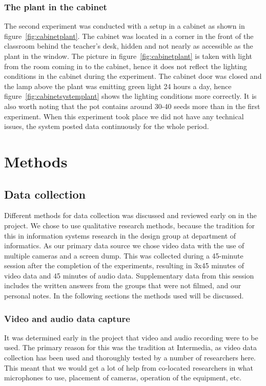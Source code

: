 \subsubsection*{The plant in the cabinet}
The second experiment was conducted with a setup in a cabinet as shown in figure~\ref{fig:cabinetplant}. The cabinet was located in a corner in the front of the classroom behind the teacher's desk, hidden and not nearly as accessible as the plant in the window. The picture in figure~\ref{fig:cabinetplant} is taken with light from the room coming in to the cabinet, hence it does not reflect the lighting conditions in the cabinet during the experiment. The cabinet door was closed and the lamp above the plant was emitting green light 24 hours a day, hence figure~\ref{fig:cabinetsystemplant} shows the lighting conditions more correctly. It is also worth noting that the pot contains around 30-40 seeds more than in the first experiment. When this experiment took place we did not have any technical issues, the system posted data continuously for the whole period.


\section{Methods}
\subsection{Data collection}
Different methods for data collection was discussed and reviewed early on in the project. We chose to use qualitative research methods, because the tradition for this in information systems research in the design group at department of informatics. As our primary data source we chose video data with the use of multiple cameras and a screen dump. This was collected during a 45-minute session after the completion of the experiments, resulting in 3x45 minutes of video data and 45 minutes of audio data. Supplementary data from this session includes the written answers from the groups that were not filmed, and our personal notes. In the following sections the methods used will be discussed. 

\subsubsection{Video and audio data capture}
It was determined early in the project that video and audio recording were to be used. The primary reason for this was the tradition at Intermedia, as video data collection has been used and thoroughly tested by a number of researchers here. This meant that we would get a lot of help from co-located researchers in what microphones to use, placement of cameras, operation of the equipment, etc. 

